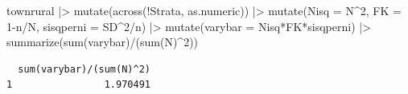 \documentclass[
  letterpaper,
  DIV=11,
  numbers=noendperiod]{scrreprt}
\newenvironment{Shaded}{\begin{snugshade}}{\end{snugshade}}
\newcommand{\AttributeTok}[1]{\textcolor[rgb]{0.40,0.45,0.13}{#1}}
\newcommand{\DecValTok}[1]{\textcolor[rgb]{0.68,0.00,0.00}{#1}}
\newcommand{\FunctionTok}[1]{\textcolor[rgb]{0.28,0.35,0.67}{#1}}
\newcommand{\NormalTok}[1]{\textcolor[rgb]{0.00,0.23,0.31}{#1}}
\newcommand{\SpecialCharTok}[1]{\textcolor[rgb]{0.37,0.37,0.37}{#1}}
\begin{document}
\begin{Shaded}
\begin{Highlighting}[]
\NormalTok{townrural }\SpecialCharTok{|\textgreater{}} 
    \FunctionTok{mutate}\NormalTok{(}\FunctionTok{across}\NormalTok{(}\SpecialCharTok{!}\NormalTok{Strata, as.numeric)) }\SpecialCharTok{|\textgreater{}}
    \FunctionTok{mutate}\NormalTok{(}\AttributeTok{Nisq =}\NormalTok{ N}\SpecialCharTok{\^{}}\DecValTok{2}\NormalTok{,}
           \AttributeTok{FK =} \DecValTok{1}\SpecialCharTok{{-}}\NormalTok{n}\SpecialCharTok{/}\NormalTok{N,}
           \AttributeTok{sisqperni =}\NormalTok{ SD}\SpecialCharTok{\^{}}\DecValTok{2}\SpecialCharTok{/}\NormalTok{n) }\SpecialCharTok{|\textgreater{}}
    \FunctionTok{mutate}\NormalTok{(}\AttributeTok{varybar =}\NormalTok{ Nisq}\SpecialCharTok{*}\NormalTok{FK}\SpecialCharTok{*}\NormalTok{sisqperni) }\SpecialCharTok{|\textgreater{}}
    \FunctionTok{summarize}\NormalTok{(}\FunctionTok{sum}\NormalTok{(varybar)}\SpecialCharTok{/}\NormalTok{(}\FunctionTok{sum}\NormalTok{(N)}\SpecialCharTok{\^{}}\DecValTok{2}\NormalTok{))}
\end{Highlighting}
\end{Shaded}

\begin{verbatim}
  sum(varybar)/(sum(N)^2)
1                1.970491
\end{verbatim}
\end{document}
